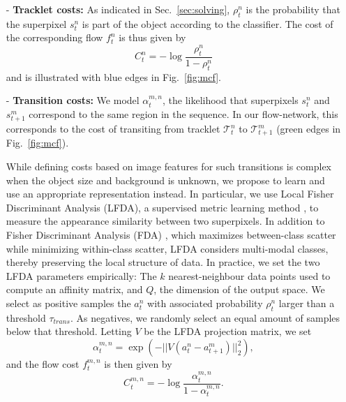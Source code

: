 \begin{itemize}
\item[-]{{\bf Tracklet costs:}} As indicated in Sec.~\ref{sec:solving}, $\rho_{t}^n$ is the probability that the superpixel $s_t^n$ is part of the object according to the classifier. The cost of the corresponding flow $f_t^n$ is thus given by
\begin{equation}
C_{t}^n = -\log \frac{\rho_t^n}{1-\rho_t^n}
\label{eq:in_frame_cost}
\end{equation}
\noindent
and is illustrated with blue edges in Fig.~\ref{fig:mcf}. 

\item[-]{{\bf Transition costs:}} We model $\alpha_t^{m,n}$, the likelihood that superpixels $s_t^n$ and $s_{t+1}^m$ correspond to the same region in the sequence. In our flow-network, this corresponds to the cost of transiting from tracklet $\mathcal{T}_t^n$ to $\mathcal{T}_{t+1}^m$ (green edges in Fig.~\ref{fig:mcf}). 

While defining costs based on image features for such transitions is complex when the object size and background is unknown, we propose to learn and use an appropriate representation instead. In particular, we use Local Fisher Discriminant Analysis (LFDA), a supervised metric learning method \cite{sugiyama06}, to measure the appearance similarity between two superpixels. In addition to Fisher Discriminant Analysis (FDA) \cite{welling05}, which maximizes between-class scatter while minimizing within-class scatter, LFDA considers multi-modal classes, thereby preserving the local structure of data. In practice, we set the two LFDA parameters empirically: The $k$ nearest-neighbour data points used to compute an affinity matrix, and $Q$, the dimension of the output space. We select as positive samples the $a_t^n$ with associated probability $\rho_t^n$ larger than a threshold $\tau_{trans}$. As negatives, we randomly select an equal amount of samples below that threshold. Letting $V$ be the LFDA projection matrix, we set
\begin{equation}
  \alpha_{t}^{m,n} = \exp \left( {-|| V(a_t^n - a_{t+1}^{m})||^2_2} \right),
\label{eq:alpha}
\end{equation}
\noindent
and the flow cost $f_t^{m,n}$ is then given by
\begin{equation}
C_{t}^{m,n} = -\log\frac{\alpha_{t}^{m,n}}{1-\alpha_{t}^{m,n}}.
\end{equation}


\end{itemize}

